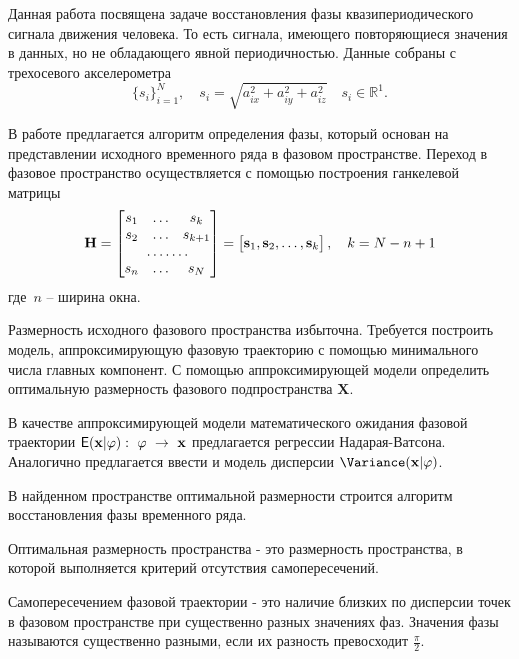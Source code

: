 \documentclass[12pt, twoside]{article}
\theoremstyle{definition}
\def\RR{\mathbb R}
\begin{document}
Данная работа посвящена задаче восстановления фазы квазипериодического сигнала движения человека. То есть сигнала, имеющего повторяющиеся значения в данных, но не обладающего явной периодичностью. Данные собраны с трехосевого акселерометра
    \begin{equation}\label{ts}
        \{ s_i \}_{i = 1}^{N},
        \quad
        s_i = \sqrt{a_{ix}^2 + a_{iy}^2 + a_{iz}^2}
        \quad
        s_i \in \RR^1.
    \end{equation}
    
В работе предлагается алгоритм определения фазы, который основан на представлении исходного временного ряда в фазовом пространстве. Переход в фазовое пространство осуществляется с помощью построения ганкелевой матрицы
    \[ \mathbf{H} = \begin{bmatrix}
                        s_1 & \dots & s_k \\
                        s_2 & \dots & s_{k+1} \\
                        \hdotsfor{3} \\
                        s_{n} & \dots & s_{N}
                    \end{bmatrix} = 
                    \begin{bmatrix}
                        \mathbf{s}_1,
                        \mathbf{s}_2, 
                        \dots,
                        \mathbf{s}_k
                    \end{bmatrix}, \quad k = N - n + 1 \]
где~$n$ -- ширина окна.

Размерность исходного фазового пространства избыточна.
Требуется построить модель, аппроксимирующую фазовую траекторию с помощью минимального числа главных компонент.
С помощью аппроксимирующей модели определить оптимальную размерность фазового подпространства $ \mathbf{X} $.

В качестве аппроксимирующей модели математического ожидания фазовой траектории $\mathsf{E}(\mathbf{x}|\varphi):~\varphi~\rightarrow~\mathbf{x}$ предлагается регрессии Надарая-Ватсона. Аналогично предлагается ввести и модель дисперсии $\Variance(\mathbf{x}|\varphi)$.

В найденном пространстве оптимальной размерности строится алгоритм восстановления фазы временного ряда.

Оптимальная размерность пространства - это размерность пространства, в которой выполняется критерий отсутствия самопересечений.

Самопересечением фазовой траектории - это наличие близких по дисперсии точек в фазовом пространстве при существенно разных значениях фаз.
Значения фазы называются существенно разными, если их разность превосходит $\frac{\pi}{2}$.
\end{document}
